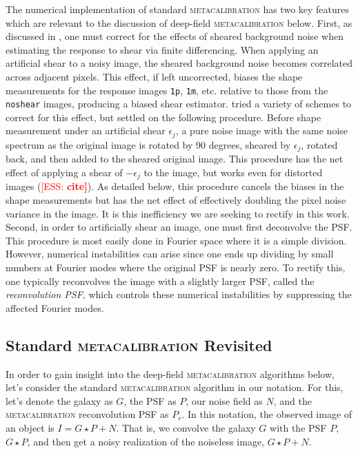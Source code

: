 \documentclass[twocolumn]{openjournal}
\makeatletter
\newcommand{\ess}[1]{\textcolor{red}{[ESS: \bf #1]}\xspace}
\newcommand{\mcal}{\textsc{metacalibration}\@\xspace}
\newcommand{\noshear}{\texttt{noshear}\@\xspace}
\makeatother
\begin{document}
The numerical implementation of standard \mcal has two key features which are relevant
to the discussion of deep-field \mcal below. First, as discussed in
\citet{SheldonMcal2017}, one must correct for the effects of sheared background noise
when estimating the response to shear via finite differencing. When applying an
artificial shear to a noisy image, the sheared background noise becomes correlated
across adjacent pixels. This effect, if left uncorrected, biases the shape measurements
for the response images \texttt{1p}, \texttt{1m}, etc. relative to those from the
\noshear images, producing a biased shear estimator. \citet{SheldonMcal2017} tried a
variety of schemes to correct for this effect, but settled on the following procedure.
Before shape measurement under an artificial shear $\epsilon_j$, a pure noise image with
the same noise spectrum as the original image is rotated by 90 degrees, sheared by
$\epsilon_j$, rotated back, and then added to the sheared original image. This procedure 
has the net effect of applying a shear of $-\epsilon_j$ to the image, but
works even for distorted images (\ess{cite}). As detailed
below, this procedure cancels the biases in the shape measurements but has the net
effect of effectively doubling the pixel noise variance in the image. It is this
inefficiency we are seeking to rectify in this work. Second, in order to artificially
shear an image, one must first deconvolve the PSF. This procedure is most easily done in
Fourier space where it is a simple division. However, numerical instabilities can arise
since one ends up dividing by small numbers at Fourier modes where the original PSF is
nearly zero. To rectify this, one typically reconvolves the image with a slightly larger
PSF, called the \textit{reconvolution PSF}, which controls these numerical instabilities
by suppressing the affected Fourier modes.


\subsection{Standard \mcal Revisited}\label{sec:mcalagain}

In order to gain insight into the deep-field \mcal algorithms below, let's consider the
standard \mcal algorithm in our notation. For this, let's denote the galaxy as $G$, the
PSF as $P$, our noise field as $N$, and the \mcal reconvolution PSF as $P_r$. In this
notation, the observed image of an object is $I = G\star P + N$. That is, we convolve
the galaxy $G$ with the PSF $P$, $G\star P$, and then get a noisy realization of the
noiseless image, $G\star P + N$.
\end{document}
